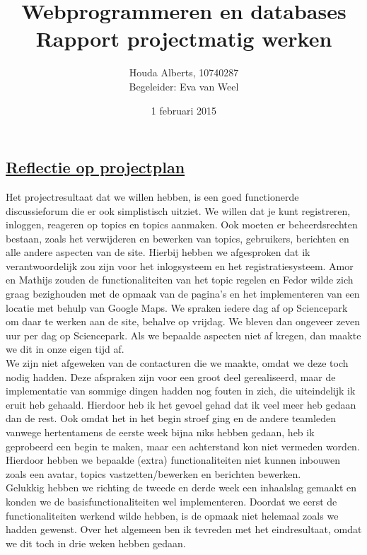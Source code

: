 \documentclass[12pt,a4paper,oneside]{article}
\begin{document}
\title{Webprogrammeren en databases \\
Rapport projectmatig werken \\}
\author{Houda Alberts, 10740287 \\
Begeleider: Eva van Weel}
\date{1 februari 2015}
\maketitle
\newpage

\subsection*{\underline{Reflectie op projectplan}}

Het projectresultaat dat we willen hebben, is een goed functionerde discussieforum die er ook simplistisch uitziet. We willen dat je kunt registreren, inloggen, reageren op topics en topics aanmaken. Ook moeten er beheerdsrechten bestaan, zoals het verwijderen en bewerken van topics, gebruikers, berichten en alle andere aspecten van de site. Hierbij hebben we afgesproken dat ik verantwoordelijk zou zijn voor het inlogsysteem en het registratiesysteem. Amor en Mathijs zouden de functionaliteiten van het topic regelen en Fedor wilde zich graag bezighouden met de opmaak van de pagina's en het implementeren van een locatie met behulp van Google Maps. We spraken iedere dag af op Sciencepark om daar te werken aan de site, behalve op vrijdag. We bleven dan ongeveer zeven uur per dag op Sciencepark. Als we bepaalde aspecten niet af kregen, dan maakte we dit in onze eigen tijd af. \\

We zijn niet afgeweken van de contacturen die we maakte, omdat we deze toch nodig hadden.  Deze afspraken zijn voor een groot deel gerealiseerd, maar de implementatie van sommige dingen hadden nog fouten in zich, die uiteindelijk ik eruit heb gehaald. Hierdoor heb ik het gevoel gehad dat ik veel meer heb gedaan dan de rest. Ook omdat het in het begin stroef ging en de andere teamleden vanwege hertentamens de eerste week bijna niks hebben gedaan, heb ik geprobeerd een begin te maken, maar een achterstand kon niet vermeden worden. Hierdoor hebben we bepaalde (extra) functionaliteiten niet kunnen inbouwen zoals een avatar, topics vastzetten/bewerken en berichten bewerken. \\

Gelukkig hebben we richting de tweede en derde week een inhaalslag gemaakt en konden we de basisfunctionaliteiten wel implementeren. Doordat we eerst de functionaliteiten werkend wilde hebben, is de opmaak niet helemaal zoals we hadden gewenst. Over het algemeen ben ik tevreden met het eindresultaat, omdat we dit toch in drie weken hebben gedaan.  
\end{document}
